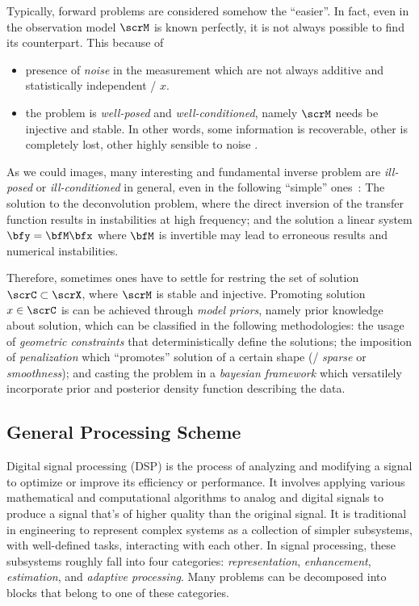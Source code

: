Typically, forward problems are considered somehow the ``easier''.
In fact, even in the observation model $\scrM$ is known perfectly, it is not always possible to find its counterpart.
This because of
\begin{itemize}
    \item presence of \textit{noise} in the measurement which are not always additive and statistically independent \wrt/ $x$.
    \item the problem is \textit{well-posed} and \textit{well-conditioned}, namely $\scrM$ needs be injective and stable.
    In other words, some information is recoverable, other is completely lost, other highly sensible to noise
    .
\end{itemize}

As we could images, many interesting and fundamental inverse problem are
\textit{ill-posed} or \textit{ill-conditioned} in general, even in the following ``simple'' ones~\cite{kitic2015cosparse}:
The solution to the deconvolution problem, where the direct inversion of the transfer function results in instabilities
at high frequency; and the solution a linear system $\bfy = \bfM \bfx$ where $\bfM$ is invertible
may lead to erroneous results and numerical instabilities.

Therefore, sometimes ones have to settle for restring the set of solution $\scrC \subset \scrX$,
where $\scrM$ is stable and injective.
Promoting solution $x \in \scrC$ is can be achieved through \textit{model priors}, namely prior knowledge about solution, which can
be classified in the following methodologies:
the usage of \textit{geometric constraints} that deterministically define the solutions; the imposition of \textit{penalization}
which ``promotes'' solution of a certain shape (\eg/ \textit{sparse}
 or \textit{smoothness});
and casting the problem in a \textit{bayesian framework} which versatilely incorporate prior and posterior density function describing the data.

\subsection{General Processing Scheme}
Digital signal processing (DSP) is the process of analyzing and modifying a signal to optimize or improve its efficiency or performance. It involves applying various mathematical and computational algorithms to analog and digital signals to produce a signal that's of higher quality than the original signal.
It is traditional in engineering to represent complex systems as a collection of simpler subsystems, with well-defined tasks, interacting with each other.
In signal processing, these subsystems roughly fall into four categories: \textit{representation}, \textit{enhancement}, \textit{estimation}, and \textit{adaptive processing}.
Many problems can be decomposed into blocks that belong to one of these categories.

